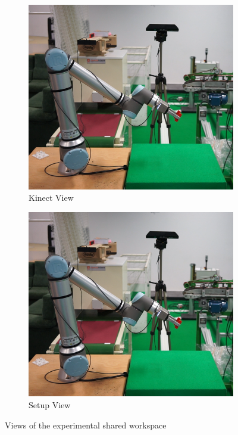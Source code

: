 \begin{figure}[h]
    \centering
    \begin{subfigure}{.5\textwidth}
      \centering
      \includegraphics[width=.9\linewidth]{figs/chp6/setup.png}
      \caption{Kinect View}
      \label{fig:kinect}
    \end{subfigure}%
    \begin{subfigure}{.5\textwidth}
      \centering
      \includegraphics[width=.9\linewidth]{figs/chp6/setup.png}
      \caption{Setup View}
      \label{fig:setup}
    \end{subfigure}
    \caption{Views of the experimental shared workspace}
    \label{fig:setup_and_kinect}
    \end{figure}

